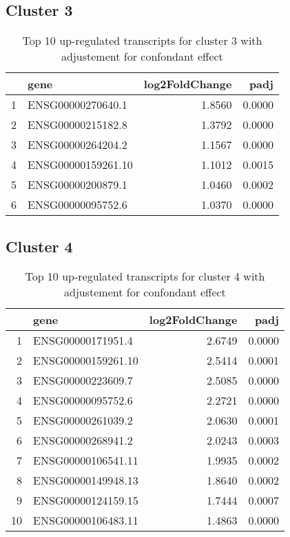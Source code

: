 \documentclass{article}
\begin{document}
\subsection{Cluster 3 }
\begin{table}[H]
\centering
\begin{tabularx}{\textwidth}{rlrr}
  \hline
 & gene & log2FoldChange & padj \\ 
  \hline
1 & ENSG00000270640.1 & 1.8560 & 0.0000 \\ 
  2 & ENSG00000215182.8 & 1.3792 & 0.0000 \\ 
  3 & ENSG00000264204.2 & 1.1567 & 0.0000 \\ 
  4 & ENSG00000159261.10 & 1.1012 & 0.0015 \\ 
  5 & ENSG00000200879.1 & 1.0460 & 0.0002 \\ 
  6 & ENSG00000095752.6 & 1.0370 & 0.0000 \\ 
   \hline
\end{tabularx}
\caption{Top 10 up-regulated transcripts for cluster 3 with adjustement for confondant effect} 
\label{tab:q3_1_conf_3}
\end{table}
\subsection{Cluster 4 }
\begin{table}[H]
\centering
\begin{tabularx}{\textwidth}{rlrr}
  \hline
 & gene & log2FoldChange & padj \\ 
  \hline
1 & ENSG00000171951.4 & 2.6749 & 0.0000 \\ 
  2 & ENSG00000159261.10 & 2.5414 & 0.0001 \\ 
  3 & ENSG00000223609.7 & 2.5085 & 0.0000 \\ 
  4 & ENSG00000095752.6 & 2.2721 & 0.0000 \\ 
  5 & ENSG00000261039.2 & 2.0630 & 0.0001 \\ 
  6 & ENSG00000268941.2 & 2.0243 & 0.0003 \\ 
  7 & ENSG00000106541.11 & 1.9935 & 0.0002 \\ 
  8 & ENSG00000149948.13 & 1.8640 & 0.0002 \\ 
  9 & ENSG00000124159.15 & 1.7444 & 0.0007 \\ 
  10 & ENSG00000106483.11 & 1.4863 & 0.0000 \\ 
   \hline
\end{tabularx}
\caption{Top 10 up-regulated transcripts for cluster 4 with adjustement for confondant effect} 
\label{tab:q3_1_conf_4}
\end{table}
\end{document}
